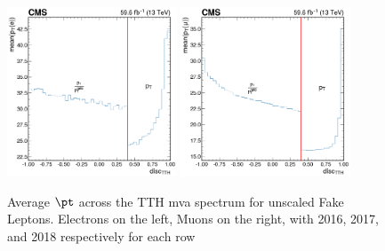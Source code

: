 \begin{figure}
  \includegraphics[width=0.45\textwidth]{cone_correction/uncorrected_Electron_0p4_2018.png} \hfill
  \includegraphics[width=0.45\textwidth]{cone_correction/uncorrected_Muon_0p4_2018.png} \\
  \caption{Average $\pt$ across the TTH mva spectrum for unscaled Fake Leptons. Electrons on the left, Muons on the right, with 2016, 2017, and 2018 respectively for each row}\label{fig:uncorrected_pt}
\end{figure}

